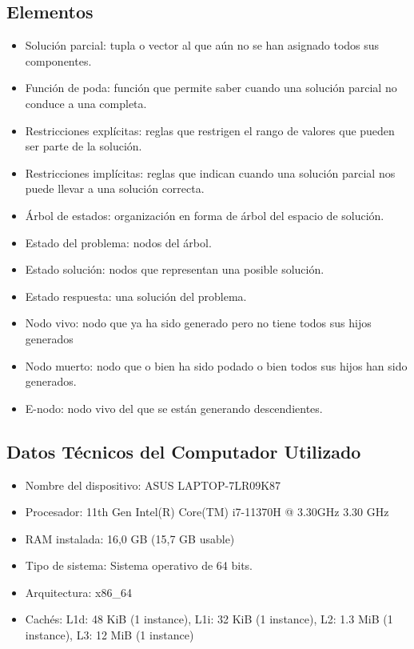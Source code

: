 \documentclass[a4paper,12pt,twoside]{article} %
\begin{document}
\subsection{Elementos}

\begin{itemize}

	\item Solución parcial: tupla o vector al que aún no se han asignado todos sus componentes.
	\item Función de poda: función que permite saber cuando una solución parcial no conduce a una completa.
	\item Restricciones explícitas: reglas que restrigen el rango de valores que pueden ser parte de la solución.
	\item Restricciones implícitas: reglas que indican cuando una solución parcial nos puede llevar a una solución correcta.
	\item Árbol de estados: organización en forma de árbol del espacio de solución.
        \item Estado del problema: nodos del árbol.
        \item Estado solución: nodos que representan una posible solución.
        \item Estado respuesta: una solución del problema.
        \item Nodo vivo: nodo que ya ha sido generado pero no tiene todos sus hijos generados
        \item Nodo muerto: nodo que o bien ha sido podado o bien todos sus hijos han sido generados.
        \item E-nodo: nodo vivo del que se están generando descendientes.
      
        

\end{itemize}

\newpage


\subsection{Datos Técnicos del Computador Utilizado}

\begin{itemize}

	\item Nombre del dispositivo: ASUS LAPTOP-7LR09K87

	\item Procesador: 11th Gen Intel(R) Core(TM) i7-11370H @ 3.30GHz   3.30 GHz

	\item RAM instalada: 16,0 GB (15,7 GB usable)

	\item Tipo de sistema: Sistema operativo de 64 bits.

	\item Arquitectura: x86\_64

	\item Cachés: L1d: 48 KiB (1 instance), L1i: 32 KiB (1 instance), L2: 1.3 MiB (1 instance), L3: 12 MiB (1 instance)

\end{itemize}
\vspace{1cm}
\end{document}
